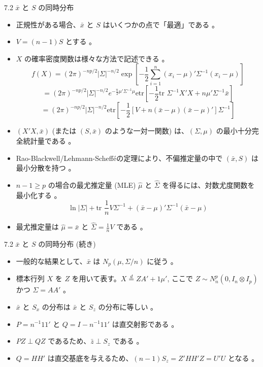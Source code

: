 \documentclass[aspectratio=169]{beamer}
\begin{document}
\begin{CJK}{UTF8}{min}
\begin{frame}{7.2 $\bar{x}$ と $S$ の同時分布}
\begin{itemize}
    \item 正規性がある場合、$\bar{x}$ と $S$ はいくつかの点で「最適」である 。
    \item $V=(n-1)S$ とする 。
    \item $X$ の確率密度関数は様々な方法で記述できる 。
    \begin{equation*}
    f(X) = (2\pi)^{-np/2} |\Sigma|^{-n/2} \exp\left[-\frac{1}{2} \sum_{i=1}^{n} (x_i - \mu)' \Sigma^{-1} (x_i - \mu)\right] \tag{7.1}
    \end{equation*}
    \begin{equation*}
    = (2\pi)^{-np/2} |\Sigma|^{-n/2} e^{-\frac{n}{2}\mu'\Sigma^{-1}\mu} \text{etr}\left[-\frac{1}{2}\text{tr }\Sigma^{-1}X'X + n\mu'\Sigma^{-1}\bar{x}\right] 
    \end{equation*}
    \begin{equation*}
    = (2\pi)^{-np/2} |\Sigma|^{-n/2} \text{etr}\left[-\frac{1}{2}[V + n(\bar{x} - \mu)(\bar{x} - \mu)']\Sigma^{-1}\right] 
    \end{equation*}
    \item $(X'X, \bar{x})$ (または $(S, \bar{x})$ のような一対一関数) は、$(\Sigma, \mu)$ の最小十分完全統計量である 。
    \item Rao-Blackwell/Lehmann-Scheff\'eの定理により、不偏推定量の中で $(\bar{x}, S)$ は最小分散を持つ 。
    \item $n-1 \ge p$ の場合の最尤推定量 (MLE) $\hat{\mu}$ と $\hat{\Sigma}$ を得るには、対数尤度関数を最小化する 。
    \begin{equation*}
    \ln |\Sigma| + \text{tr }\frac{1}{n}V\Sigma^{-1} + (\bar{x} - \mu)'\Sigma^{-1}(\bar{x} - \mu) \tag{7.2}
    \end{equation*}
    \item 最尤推定量は $\hat{\mu} = \bar{x}$ と $\hat{\Sigma} = \frac{1}{n}V$ である 。
\end{itemize}
\end{frame}

\begin{frame}{7.2 $\bar{x}$ と $S$ の同時分布 (続き)}
\begin{itemize}
    \item 一般的な結果として、$\bar{x}$ は $N_p(\mu, \Sigma/n)$ に従う 。
    \item 標本行列 $X$ を $Z$ を用いて表す。$X \overset{d}{=} ZA' + 1\mu'$, ここで $Z \sim N_n^p(0, I_n \otimes I_p)$ かつ $\Sigma=AA'$ 。
    \item $\bar{x}$ と $S_x$ の分布は $\bar{x}$ と $S_z$ の分布に等しい 。
    \item $P=n^{-1}11'$ と $Q=I-n^{-1}11'$ は直交射影である 。
    \item $PZ \perp QZ$ であるため、$\bar{z} \perp S_z$ である 。
    \item $Q=HH'$ は直交基底を与えるため、$(n-1)S_z = Z'HH'Z = U'U$ となる 。
\end{itemize}
\end{frame}


\end{CJK}
\end{document}

